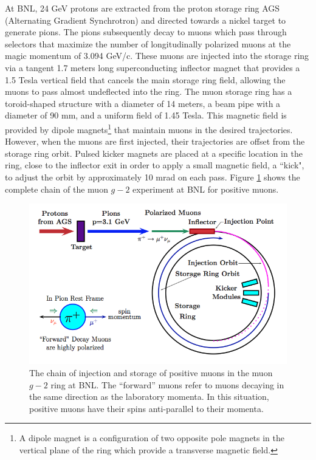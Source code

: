 \documentclass{outhesis}
\begin{document}
At BNL, 24 GeV protons are extracted from the proton storage ring AGS (Alternating Gradient Synchrotron) and directed towards a nickel target to generate pions. The pions subsequently decay to muons which pass through selectors that maximize the number of longitudinally polarized muons at the magic momentum of 3.094 GeV/c. These muons are injected into the storage ring via a tangent 1.7 meters long superconducting inflector magnet that provides a 1.5 Tesla vertical field that cancels the main storage ring field, allowing the muons to pass almost undeflected into the ring. The muon storage ring has a toroid-shaped structure with a diameter of 14 meters, a beam pipe with a diameter of 90 mm, and a uniform field of 1.45 Tesla. This magnetic field is provided by dipole magnets\footnote{A dipole magnet is a configuration of two opposite pole magnets in the vertical plane of the ring which provide a transverse magnetic field.} that maintain muons in the desired trajectories. However, when the muons are first injected, their trajectories are offset from the storage ring orbit. Pulsed kicker magnets are placed at a specific location in the ring, close to the inflector exit in order to apply a small magnetic field, a ``kick", to adjust the orbit by approximately 10 mrad on each pass. Figure \ref{fig:chain} shows the complete chain of the muon $g-2$ experiment at BNL for positive muons.
 \begin{figure}
    \centering
  \includegraphics[scale=0.39]{figures/chain}
   \caption{The chain of injection and storage of positive muons in the muon $g-2$ ring at BNL. The ``forward'' muons refer to muons decaying in the same direction as the laboratory momenta. In this situation, positive muons have their spins anti-parallel to their momenta. \cite{phen}}
  \label{fig:chain}
\end{figure}
\end{document}
